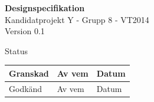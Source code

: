 \documentclass[a4paper,12pt,fleqn]{article}
\begin{document}
	\pagestyle{fancy}
	\vspace*{\fill}
		\begingroup
			\begin{center}
				\huge{\textbf{Designspecifikation}}
				\\
				\vspace{5pt}
				\normalsize
				Kandidatprojekt Y - Grupp 8 - VT2014
				\\
				Version 0.1
				\end{center}
		\endgroup
	\vspace*{\fill}
	
	\begin{center} %
		Status
		\\
		\vspace{3pt} %
	    \begin{tabular}{| p{3cm} | p{3cm} | p{3cm} |} %
	    \hline %
	    Granskad & Av vem & Datum \\ \hline %
		Godkänd & Av vem & Datum \\ \hline %

	    \end{tabular}
	\end{center}
	\vspace{2cm}
	\newpage
	
\end{document}
